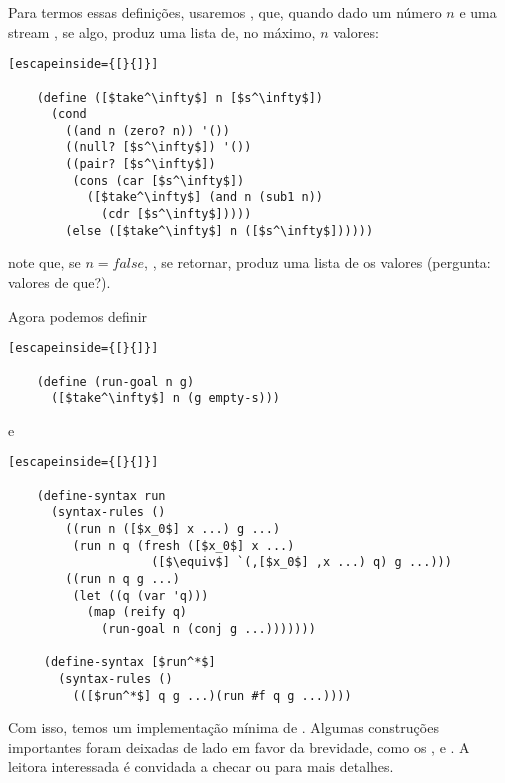 \documentclass{article}
\begin{document}
  Para termos essas definições, usaremos ,
  que, quando dado um número $n$ e uma stream , se
  algo, produz uma lista de, no máximo, $n$ valores:

  \begin{lstlisting}[escapeinside={[}{]}]

    (define ([$take^\infty$] n [$s^\infty$])
      (cond
        ((and n (zero? n)) '())
        ((null? [$s^\infty$]) '())
        ((pair? [$s^\infty$])
         (cons (car [$s^\infty$])
           ([$take^\infty$] (and n (sub1 n))
             (cdr [$s^\infty$]))))
        (else ([$take^\infty$] n ([$s^\infty$])))))

  \end{lstlisting}

  \noindent note que, se $n = false$, , se
  retornar, produz uma lista de  os valores (pergunta:
  valores de que?).

  Agora podemos definir

  \begin{lstlisting}[escapeinside={[}{]}]

    (define (run-goal n g)
      ([$take^\infty$] n (g empty-s)))

  \end{lstlisting}

  \noindent e

  \begin{lstlisting}[escapeinside={[}{]}]

    (define-syntax run
      (syntax-rules ()
        ((run n ([$x_0$] x ...) g ...)
         (run n q (fresh ([$x_0$] x ...)
                    ([$\equiv$] `(,[$x_0$] ,x ...) q) g ...)))
        ((run n q g ...)
         (let ((q (var 'q)))
           (map (reify q)
             (run-goal n (conj g ...)))))))

     (define-syntax [$run^*$]
       (syntax-rules ()
         (([$run^*$] q g ...)(run #f q g ...))))

  \end{lstlisting}

  Com isso, temos um implementação mínima de
  . Algumas construções importantes foram
  deixadas de lado em favor da brevidade, como os
  ,  e .
  A leitora interessada é convidada a checar \cite{will} ou
  \cite{kanren} para mais detalhes.
  
  
\end{document}
